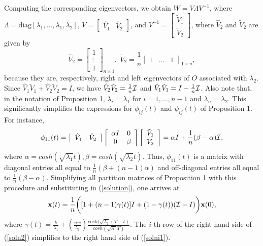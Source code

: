 \documentclass[10pt, conference, compsocconf]{IEEEtran}
\begin{document}
Computing the corresponding eigenvectors, 
we obtain $W = V \Lambda V^{-1}$, where $\Lambda = \mbox{diag} \left[ \lambda_1, ... ,\lambda_1, \lambda_2 \right]$, $V = \left[ \begin{array}{cc} \hat{V}_1&\hat{V}_2 \end{array} \right]$, and $V^{-1} = \left[ \begin{array}{c} \tilde{V}_1 \\
\tilde{V}_2 \end{array} \right]$, 
where $\hat{V}_{2}$ and $\tilde{V}_2$ are given by 
\[
 \hat{V}_2 = \left[ \begin{array}{c}1 \\ \vdots \\ 1\end{array} \right]_{n\times 1},\;\tilde{V}_2 = \frac{1}{n}\left[ \begin{array}{ccc}
1&\dots&1
\end{array} \right]_{1\times n},
\]
because they are, respectively, right and left eigenvectors of $O$ associated with
$\lambda_{2}$. 
Since $\hat{V}_1 \tilde{V}_1 + \hat{V}_2 \tilde{V}_2 = I$, we have  $\hat{V}_2 \tilde{V}_2 = \frac{1}{n} {\cal I}$ and $\hat{V}_1 \tilde{V}_1=I-\frac{1}{n} {\cal I}$. Also note that, in the notation of Proposition 1,  $\lambda_i=\lambda_{1}$ for $i=1,...,n-1$ and 
$\lambda_n=\lambda_{2}$. This significantly simplifies the expressions for $\phi_{ij}(t)$ and $\psi_{ij}(t)$ of Proposition 1. For instance,
\[
\phi_{11}(t)= \left[ \begin{array}{cc} \hat{V}_1&\hat{V}_2 \end{array} \right]\left[ \begin{array}{cc}\alpha I&0\\0&\beta\end{array} \right]\left[ \begin{array}{c} \tilde{V}_1 \\
\tilde{V}_2 \end{array} \right]=\alpha I+\frac{1}{n}(\beta-\alpha){\cal I},
\]
where $\alpha = cosh(\sqrt{\lambda_{1}}t), \beta = cosh(\sqrt{\lambda_{2}}t)$. Thus, $\phi_{11}(t)$ is a matrix with diagonal entries all equal to $\frac{1}{n}(\beta+(n-1)\alpha)$ and off-diagonal entries all equal to $\frac{1}{n}(\beta-\alpha)$.  Simplifying all partition matrices of Proposition 1 with this procedure and substituting in (\ref{solution}), one arrives at 
\begin{equation} \label{soln2}
	\mathbf{x}(t) = \frac{1}{n} \biggl( [ 1+(n-1)\gamma(t) ] I + ( 1-\gamma(t) ) ({\cal{I}} - I) \biggr) \mathbf{x}(0),
\end{equation}
where $\gamma(t) = \frac{k}{\lambda_1} + \left( \frac{nw}{\lambda_1} \right) \frac{cosh(\sqrt{\lambda_1}(T-t)}{cosh(\sqrt{\lambda_1}T)}$.
The $i$-th row of the right hand side of (\ref{soln2}) simplifies to the right hand side of (\ref{solni1}).
\end{document}
